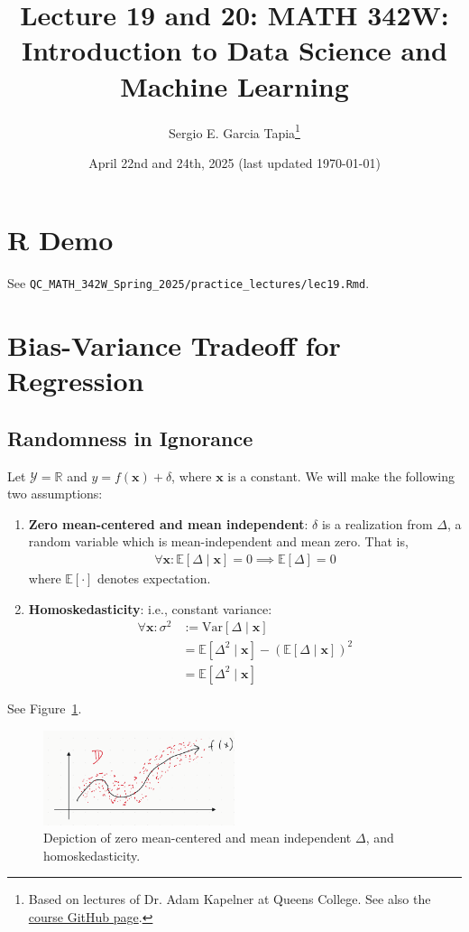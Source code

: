 \documentclass[12pt, a4paper]{article}
\title{Lecture 19 and 20: MATH 342W: Introduction to Data Science and Machine Learning}
\author{Sergio E. Garcia Tapia\thanks{Based on lectures of Dr. Adam Kapelner at Queens College.
See also the \href{https://github.com/kapelner/QC_MATH_342W_Spring_2025}{course GitHub page}.}}
\date{April 22nd and 24th, 2025 (last updated \today)}
\theoremstyle{definition}
\begin{document}
	\maketitle
	\section*{R Demo}
	See \verb|QC_MATH_342W_Spring_2025/practice_lectures/lec19.Rmd|.
	
	\section*{Bias-Variance Tradeoff for Regression}
	\subsection*{Randomness in Ignorance}
	Let $\mathcal{Y} = \mathbb{R}$ and $y = f(\bm{x}) + \delta$,
	where $\bm{x}$ is a constant. We will make the following two assumptions:
	\begin{enumerate}[label=(\Roman*)]
		\item \textbf{Zero mean-centered and mean independent}: $\delta$ is a realization
		from $\Delta$, a random variable which is mean-independent and mean zero.
		That is,
		\begin{align}
			\forall \bm{x}: \mathbb{E}[\Delta \mid \bm{x}] = 0\implies \mathbb{E}[\Delta] = 0
			\label{eqn:assumption-1-mean-zero-independent}
		\end{align}
		where $\mathbb{E}[\cdot]$ denotes expectation.
		\item \textbf{Homoskedasticity}: i.e., constant variance:
		\begin{align}
			\forall \bm{x}: \sigma^2 &:=\text{Var}[\Delta \mid \bm{x}]\label{eqn:assumption-2-homosk}\\
			&=\mathbb{E}[\Delta^2 \mid \bm{x}] - (\mathbb{E}[\Delta \mid \bm{x}])^2\nonumber\\
			&=\mathbb{E}[\Delta^2 \mid \bm{x}]
			\tag{by (I)}
		\end{align}
	\end{enumerate}
	See Figure~\ref{fig:assumption-1-and-2}.
	\begin{figure}
		\centering
		\includegraphics[width=0.5\textwidth]{homosk-mean-zero-centered}
		\caption{Depiction of zero mean-centered and mean independent $\Delta$,
		and homoskedasticity.}
		\label{fig:assumption-1-and-2}
	\end{figure}
\end{document}
